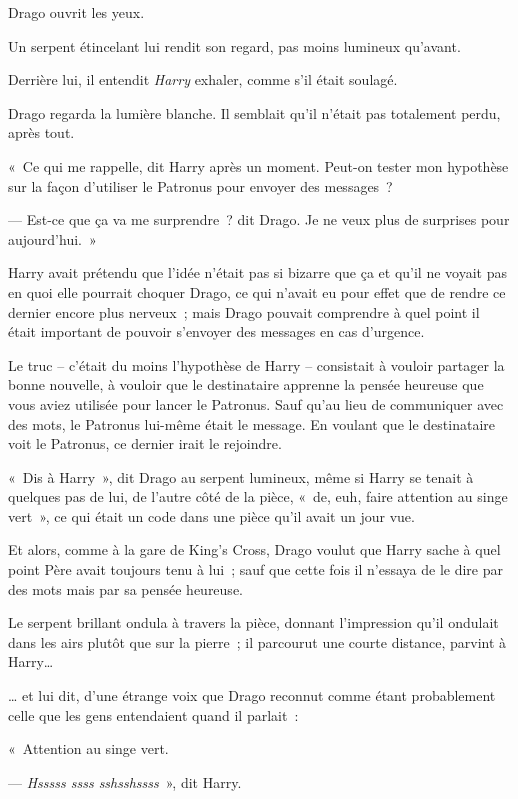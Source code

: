 Drago ouvrit les yeux.

Un serpent étincelant lui rendit son regard, pas moins lumineux qu'avant.

Derrière lui, il entendit \emph{Harry} exhaler, comme s'il était soulagé.

Drago regarda la lumière blanche. Il semblait qu'il n'était pas totalement perdu, après tout.

«~Ce qui me rappelle, dit Harry après un moment. Peut-on tester mon hypothèse sur la façon d'utiliser le Patronus pour envoyer des messages~?

--- Est-ce que ça va me surprendre~? dit Drago. Je ne veux plus de surprises pour aujourd'hui.~»

\later

Harry avait prétendu que l'idée n'était pas si bizarre que ça et qu'il ne voyait pas en quoi elle pourrait choquer Drago, ce qui n'avait eu pour effet que de rendre ce dernier encore plus nerveux~; mais Drago pouvait comprendre à quel point il était important de pouvoir s'envoyer des messages en cas d'urgence.

Le truc -- c'était du moins l'hypothèse de Harry -- consistait à vouloir partager la bonne nouvelle, à vouloir que le destinataire apprenne la pensée heureuse que vous aviez utilisée pour lancer le Patronus. Sauf qu'au lieu de communiquer avec des mots, le Patronus lui-même était le message. En voulant que le destinataire voit le Patronus, ce dernier irait le rejoindre.

«~Dis à Harry~», dit Drago au serpent lumineux, même si Harry se tenait à quelques pas de lui, de l'autre côté de la pièce, «~de, euh, faire attention au singe vert~», ce qui était un code dans une pièce qu'il avait un jour vue.

Et alors, comme à la gare de King's Cross, Drago voulut que Harry sache à quel point Père avait toujours tenu à lui~; sauf que cette fois il n'essaya de le dire par des mots mais par sa pensée heureuse.

Le serpent brillant ondula à travers la pièce, donnant l'impression qu'il ondulait dans les airs plutôt que sur la pierre~; il parcourut une courte distance, parvint à Harry…

… et lui dit, d'une étrange voix que Drago reconnut comme étant probablement celle que les gens entendaient quand il parlait~:

«~Attention au singe vert.

--- \emph{Hsssss ssss sshsshssss}~», dit Harry.

